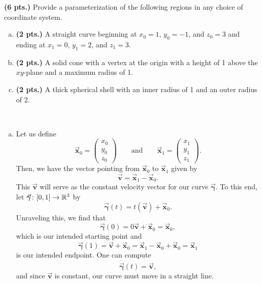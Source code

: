 \documentclass[12pt]{article} %
\newcommand{\curvegamma}{\boldsymbol{\vec{\gamma}}}
\newcommand{\tangentgamma}{\boldsymbol{\dot{\vec{\gamma}}}}
\newcommand{\vf}[1]{\boldsymbol{\vec{#1}}}
\begin{document}
\newpage
\begin{problem}
	\textbf{(6 pts.)} Provide a parameterization of the following regions in any choice of coordinate system.
	\begin{enumerate}[(a)]
		\item \textbf{(2 pts.)} A straight curve beginning at $x_0=1$, $y_0=-1$, and $z_0=3$ and ending at $x_1 = 0$, $y_1=2$, and $z_1=3$.
		\item \textbf{(2 pts.)} A solid cone with a vertex at the origin with a height of 1 above the $xy$-plane and a maximum radius of 1.
		\item \textbf{(2 pts.)} A thick spherical shell with an inner radius of 1 and an outer radius of 2.
	\end{enumerate}
\end{problem}
\begin{solution}~
\begin{enumerate}[(a)]
\item Let us define 
\[
\vf{x}_0 = \begin{pmatrix} x_0 \\ y_0 \\ z_0 \end{pmatrix} \qquad \textrm{and} \qquad \vf{x}_1 = \begin{pmatrix} x_1 \\ y_1 \\ z_1 \end{pmatrix}.
\]
Then, we have the vector pointing from $\vf{x}_0$ to $\vf{x}_1$ given by
\[
\vf{v} = \vf{x}_1-\vf{x}_0.
\]
This $\vf{v}$ will serve as the constant velocity vector for our curve $\curvegamma$. To this end, let $\curvegamma \colon [0,1] \to \R^3$ by
\[
\curvegamma(t) = t(\vf{v})+\vf{x}_0.
\]
Unraveling this, we find that 
\[
\curvegamma(0)= 0\vf{v}+\vf{x}_0 = \vf{x}_0,
\]
which is our intended starting point and
\[
\curvegamma(1) = \vf{v} + \vf{x}_0 = \vf{x}_1 - \vf{x}_0 + \vf{x}_0 = \vf{x}_1
\]
is our intended endpoint. One can compute 
\[
\tangentgamma(t) = \vf{v},
\]
and since $\vf{v}$ is constant, our curve must move in a straight line. 


\end{enumerate}
\end{solution}
\end{document}
